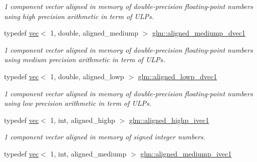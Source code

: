 \begin{DoxyCompactItemize}
\begin{DoxyCompactList}\small\item\em 1 component vector aligned in memory of double-\/precision floating-\/point numbers using high precision arithmetic in term of U\+L\+Ps. \end{DoxyCompactList}\item 
\mbox{\label{group__gtc__type__aligned_gad123cfb2803e67ae9f973bbd57bf86e3}} 
typedef \hyperlink{structglm_1_1vec}{vec}$<$ 1, double, aligned\+\_\+mediump $>$ \hyperlink{group__gtc__type__aligned_gad123cfb2803e67ae9f973bbd57bf86e3}{glm\+::aligned\+\_\+mediump\+\_\+dvec1}
\begin{DoxyCompactList}\small\item\em 1 component vector aligned in memory of double-\/precision floating-\/point numbers using medium precision arithmetic in term of U\+L\+Ps. \end{DoxyCompactList}\item 
\mbox{\label{group__gtc__type__aligned_gaa0811727b30ac5c917d48f43354f2d1f}} 
typedef \hyperlink{structglm_1_1vec}{vec}$<$ 1, double, aligned\+\_\+lowp $>$ \hyperlink{group__gtc__type__aligned_gaa0811727b30ac5c917d48f43354f2d1f}{glm\+::aligned\+\_\+lowp\+\_\+dvec1}
\begin{DoxyCompactList}\small\item\em 1 component vector aligned in memory of double-\/precision floating-\/point numbers using low precision arithmetic in term of U\+L\+Ps. \end{DoxyCompactList}\item 
\mbox{\label{group__gtc__type__aligned_ga90ebad7148156f223d4743091c9870d5}} 
typedef \hyperlink{structglm_1_1vec}{vec}$<$ 1, int, aligned\+\_\+highp $>$ \hyperlink{group__gtc__type__aligned_ga90ebad7148156f223d4743091c9870d5}{glm\+::aligned\+\_\+highp\+\_\+ivec1}
\begin{DoxyCompactList}\small\item\em 1 component vector aligned in memory of signed integer numbers. \end{DoxyCompactList}\item 
\mbox{\label{group__gtc__type__aligned_ga03b5b767207f413195dde0290a19dac1}} 
typedef \hyperlink{structglm_1_1vec}{vec}$<$ 1, int, aligned\+\_\+mediump $>$ \hyperlink{group__gtc__type__aligned_ga03b5b767207f413195dde0290a19dac1}{glm\+::aligned\+\_\+mediump\+\_\+ivec1}

\end{DoxyCompactItemize}
